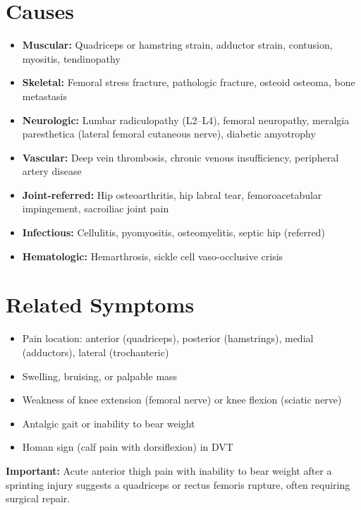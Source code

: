 \section*{Causes}
\begin{itemize}
  \item \textbf{Muscular:} Quadriceps or hamstring strain, adductor strain, contusion, myositis, tendinopathy
  \item \textbf{Skeletal:} Femoral stress fracture, pathologic fracture, osteoid osteoma, bone metastasis
  \item \textbf{Neurologic:} Lumbar radiculopathy (L2--L4), femoral neuropathy, meralgia paresthetica (lateral femoral cutaneous nerve), diabetic amyotrophy
  \item \textbf{Vascular:} Deep vein thrombosis, chronic venous insufficiency, peripheral artery disease
  \item \textbf{Joint-referred:} Hip osteoarthritis, hip labral tear, femoroacetabular impingement, sacroiliac joint pain
  \item \textbf{Infectious:} Cellulitis, pyomyositis, osteomyelitis, septic hip (referred)
  \item \textbf{Hematologic:} Hemarthrosis, sickle cell vaso-occlusive crisis
\end{itemize}

\section*{Related Symptoms}
\begin{itemize}
  \item Pain location: anterior (quadriceps), posterior (hamstrings), medial (adductors), lateral (trochanteric)
  \item Swelling, bruising, or palpable mass
  \item Weakness of knee extension (femoral nerve) or knee flexion (sciatic nerve)
  \item Antalgic gait or inability to bear weight
  \item Homan sign (calf pain with dorsiflexion) in DVT
\end{itemize}
\textbf{Important:} Acute anterior thigh pain with inability to bear weight after a sprinting injury suggests a quadriceps or rectus femoris rupture, often requiring surgical repair.

